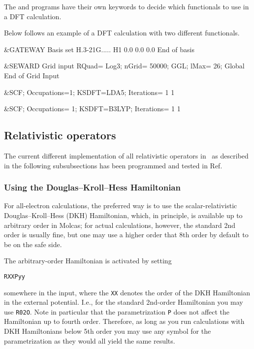 The  and  programs have
their own keywords to decide which functionals to use in a DFT calculation.

Below follows an example of a DFT calculation with two different functionals.

\begin{inputlisting}
 &GATEWAY
Basis set
H.3-21G.....
H1 0.0  0.0 0.0
End of basis

 &SEWARD
Grid input
 RQuad= Log3; nGrid= 50000; GGL; lMax= 26; Global
End of Grid Input

 &SCF; Occupations=1; KSDFT=LDA5; Iterations= 1 1

 &SCF; Occupations= 1; KSDFT=B3LYP; Iterations= 1 1

\end{inputlisting}

\subsection{Relativistic operators}

The current different implementation of all relativistic operators in \molcas\ as
described in the following subsubsections has been programmed and tested in
Ref.\cite{R2C_review}

\subsubsection{Using the Douglas--Kroll--Hess Hamiltonian}

For all-electron calculations, the preferred way is to use the scalar-relativistic
Douglas--Kroll--Hess (DKH) Hamiltonian, which, in principle, is available up to arbitrary
order in Molcas; for actual calculations, however,
the standard 2nd order is usually fine, but one may use a higher order that 8th order
by default to be on the safe side.

The arbitrary-order Hamiltonian is activated by setting

\hspace*{1cm} {\tt RXXPyy}

somewhere in the  input, where
the {\tt XX} denotes the order of the DKH Hamiltonian in the external potential.
I.e., for the standard 2nd-order Hamiltonian you may use {\tt R02O}.
Note
in particular that the parametrization {\tt P} does not affect the Hamiltonian up to
fourth order. Therefore, as long as you run calculations with DKH Hamiltonians below
5th order you may use any symbol for the parametrization as they would all yield the
same results.

